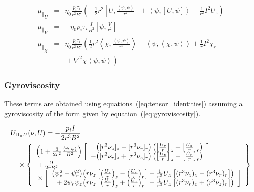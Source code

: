 \documentclass[letterpaper]{book}
\newcommand{\tensor}[1]{\mathsf{#1}}
\renewcommand{\P}{\tensor{\Pi}}
\newcommand{\lp}[1]{\nabla^2 #1}
\newcommand{\pb}[2]{\left[#1,#2\right]}
\newcommand{\ip}[2]{\left\langle  #1,#2\right\rangle}
\begin{document}
\begin{eqnarray*}
  {\mu_\parallel}_U & = & \eta_0 \frac{p_i \tau_i}{r^2 B^2} \left( 
  - \frac{1}{2} r^2 \pb{U}{\frac{\ip{\psi}{\psi}}{r^2}}
  + \ip{\psi}{\pb{U}{\psi}}
  - \frac{1}{r^2} I^2 U_z \right)
  \\
  {\mu_\parallel}_V & = & -\eta_0 p_i \tau_i \frac{I}{B^2} 
  \pb{\psi}{\frac{V}{r^2}}
  \\
  {\mu_\parallel}_\chi & = & \eta_0 \frac{p_i \tau_i}{r^2 B^2} \left(
    \frac{1}{2} r^2 \ip{\chi}{\frac{\ip{\psi}{\psi}}{r^2}}
  - \ip{\psi}{\ip{\chi}{\psi}}
  + \frac{1}{r} I^2 \chi_r 
  \right.\\ && \left. \mbox{}
  + \lp{\chi} \ip{\psi}{\psi}
  \right)
\end{eqnarray*}


\subsubsection{Gyroviscosity}

These terms are obtained using equations~(\ref{eq:tensor_identities})
assuming a gyroviscosity of the form given by
equation~(\ref{eq:gyroviscosity}).

\begin{eqnarray*}
  & \lefteqn{U_{\P_\times U}(\nu, U) = -\frac{p_i I}{2 r^3 B^2}} & 
  \\ & & \mbox{} \times
    \left\{ \begin{array}{l} 
      \left(1+\frac{3}{2 r^2}\frac{\ip{\psi}{\psi}}{B^2}\right)
      \left[ \begin{array}{r@{}l}
	     & \left( [r^3 \nu_z]_z - [r^3 \nu_r]_r \right)
	       \left( \left[\frac{U_r}{r}\right]_z 
	            + \left[\frac{U_z}{r}\right]_r \right) 
             \\ \mbox{}
	   - & \left( [r^3 \nu_r]_z + [r^3 \nu_z]_r \right)
	       \left( \left[\frac{U_z}{r}\right]_z 
	            - \left[\frac{U_r}{r}\right]_r \right) 
	     \end{array} \right]
       \\ \mbox{}
      + \frac{9}{2 r B^2} 
      \\ \mbox{} \times \left[ 
	\begin{array}{r@{}l}
	  \left( \psi_z^2 - \psi_r^2 \right) &
	  \left( r \nu_z \left[ 
	    \left( \frac{U_z}{r} \right)_z -
	    \left( \frac{U_r}{r} \right)_r \right]
          -\frac{1}{r^3} U_z \left[ 
	    (r^3 \nu_z)_z - (r^3 \nu_r)_r \right] \right)
	  \\ 
	  \mbox{} + 2 \psi_r \psi_z &
          \left( r \nu_z \left[ 
	    \left( \frac{U_r}{r} \right)_z +
	    \left( \frac{U_z}{r} \right)_r \right]
          -\frac{1}{r^3} U_z \left[ 
	    (r^3 \nu_r)_z + (r^3 \nu_z)_r \right] \right)
	  \end{array} \right] 
    \end{array} \right\}
\end{eqnarray*}
\end{document}
